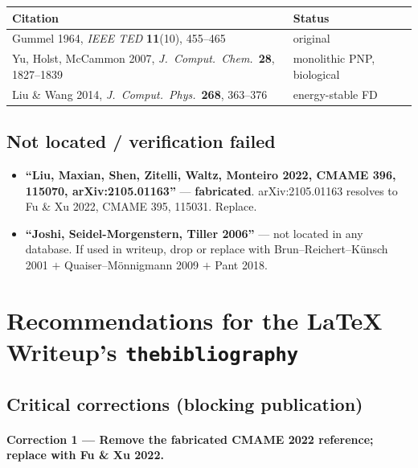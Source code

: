 \documentclass[11pt]{article}
\begin{document}
\begin{center}
\small
\begin{tabular}{@{}p{} p{}@{}}
\toprule
\textbf{Citation} & \textbf{Status} \\
\midrule
Gummel 1964, \emph{IEEE TED} \textbf{11}(10), 455--465 & original \\
Yu, Holst, McCammon 2007, \emph{J.~Comput.~Chem.}\ \textbf{28}, 1827--1839 &
monolithic PNP, biological \\
Liu \& Wang 2014, \emph{J.~Comput.~Phys.}\ \textbf{268}, 363--376 &
energy-stable FD \\
\bottomrule
\end{tabular}
\end{center}

\subsection{Not located / verification failed}

\begin{itemize}
\item \textbf{``Liu, Maxian, Shen, Zitelli, Waltz, Monteiro 2022, CMAME 396,
      115070, arXiv:2105.01163''} --- \textbf{fabricated}. arXiv:2105.01163
      resolves to Fu \& Xu 2022, CMAME 395, 115031. Replace.
\item \textbf{``Joshi, Seidel-Morgenstern, Tiller 2006''} --- not located in
      any database. If used in writeup, drop or replace with Brun--Reichert--K\"unsch
      2001 $+$ Quaiser--M\"onnigmann 2009 $+$ Pant 2018.
\end{itemize}

\section{Recommendations for the LaTeX Writeup's \texttt{thebibliography}}

\subsection{Critical corrections (blocking publication)}

\paragraph{Correction 1 --- Remove the fabricated CMAME 2022 reference;
replace with Fu \& Xu 2022.}
\end{document}
